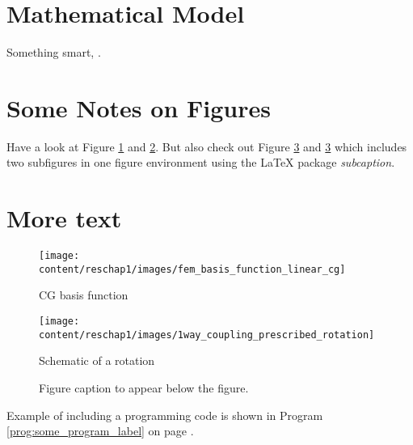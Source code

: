 \section{Mathematical Model}
Something smart, \cite{Gorman2006phd}.

\section{Some Notes on Figures}
Have a look at Figure \ref{fig:basis_fun_cg} and \ref{fig:rotation_schematic}. But also check out Figure \ref{fig:basis_functions} and \ref{fig:basis_functions} which includes two subfigures in one figure environment using the \LaTeX{} package \textsl{subcaption}.

\section{More text}
\blindtext

\begin{figure}[p]
 \centering
 \texttt{[image: content/reschap1/images/fem\_basis\_function\_linear\_cg]}
 \caption[Basis function]{CG basis function}
 \label{fig:basis_fun_cg}
\end{figure}

\begin{figure}[p]
 \centering
 \texttt{[image: content/reschap1/images/1way\_coupling\_prescribed\_rotation]}
 \caption[Schematic]{Schematic of a rotation}
 \label{fig:rotation_schematic}
\end{figure}

\begin{figure}[p!]
 \centering
 \captionsetup[sub]{skip=0ex}
 \hfill
%
 \caption[Figure caption to appear in \textsl{List of Figures}]{Figure caption to appear below the figure.}
 \label{fig:basis_functions}
\end{figure}

Example of including a programming code is shown in Program \ref{prog:some_program_label} on page \pageref{prog:some_program_label}.

\clearpage
\begin{program}[p]

\end{program}
